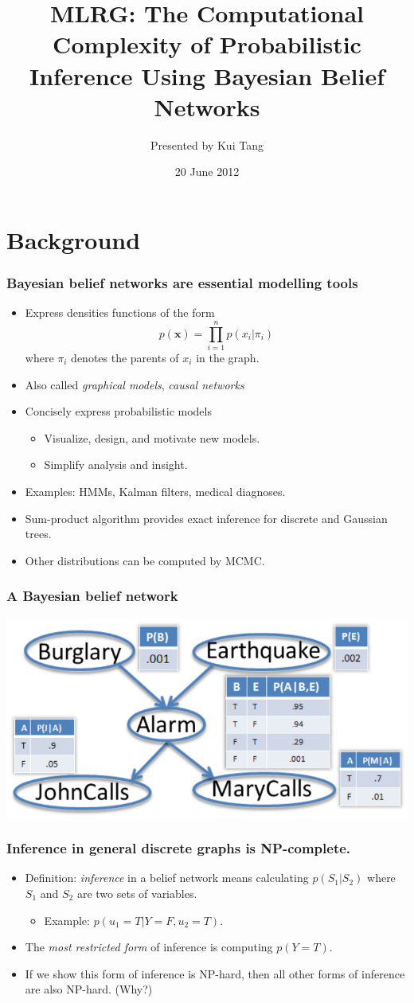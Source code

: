 \documentclass{beamer}
\title[MLRG: Bayes. Net. Complexity]{MLRG: The Computational Complexity of Probabilistic Inference Using Bayesian Belief Networks}
\author[Kui Tang]{Presented by Kui Tang}
\date{20 June 2012}
\begin{document}
\frame{\titlepage}
\section{Background}
\begin{frame}
\frametitle{Bayesian belief networks are essential modelling tools}
\begin{itemize}
  \item Express densities functions of the form $$p(\mathbf{x}) = \prod_{i=1}^n p(x_i | \pi_i)$$ where $\pi_i$ denotes the parents of $x_i$ in the graph.
  \item Also called \emph{graphical models}, \emph{causal networks}
  \item Concisely express probabilistic models%
  \begin{itemize}
    \item Visualize, design, and motivate new models.
    \item Simplify analysis and insight.
  \end{itemize}
  \item Examples: HMMs, Kalman filters, medical diagnoses.
  \item Sum-product algorithm provides exact inference for discrete and Gaussian trees.
  \item Other distributions can be computed by MCMC.
\end{itemize}
\end{frame}

\begin{frame}
\frametitle{A Bayesian belief network}
\includegraphics[width = \textwidth]{bayesnet}
\end{frame}

\begin{frame}
\frametitle{Inference in general discrete graphs is NP-complete.}
\begin{itemize}
  \item Definition: \emph{inference} in a belief network means calculating $p(S_1 | S_2)$ where $S_1$ and $S_2$ are two sets of variables.
  \begin{itemize}
    \item Example: $p(u_1 = T | Y = F, u_2 = T)$.
  \end{itemize}
  \item The \emph{most restricted form} of inference is computing $p(Y = T)$.
  \item If we show this form of inference is NP-hard, then all other forms of inference are also NP-hard. (Why?)
\end{itemize}
\end{frame}
\end{document}
